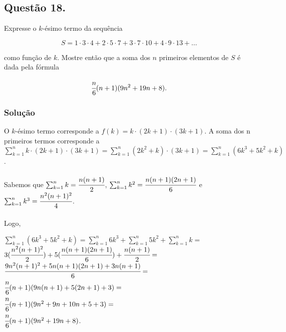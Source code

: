 \documentclass[12pt, letterpaper]{report}
\newcounter{ProblemNum}
\newcommand*{\anyproblem}[1]{\newpage\subsection*{#1}}
\newcommand*{\problem}[1]{\stepcounter{ProblemNum} %
   \anyproblem{Questão #1}}
\newcommand*{\soln}[1]{\subsubsection*{#1}}
\newcommand*{\solution}{\soln{Solução}}
\begin{document}
\problem{18.}
  Expresse o $ k $-ésimo termo da sequência 

  \begin{equation}
    S = 1 \cdot 3 \cdot 4 + 2 \cdot 5 \cdot 7 + 3 \cdot 7 \cdot 10 + 4 \cdot 9 \cdot 13 + \dots 
  \end{equation}

  como função de $ k $. Mostre então que a soma dos $ n $ primeiros elementos de $ S $ é dada pela fórmula

  \begin{equation}
    \cfrac{n}{6} (n + 1) (9n^2 + 19n + 8).
  \end{equation}

\solution
    O $k$-ésimo termo corresponde a $f(k) = k \cdot (2k + 1) \cdot (3k + 1)$. A soma dos n primeiros termos corresponde a $ \sum_{k = 1}^n k \cdot (2k + 1) \cdot (3k + 1) = \sum_{k = 1}^n (2k^2 + k) \cdot (3k + 1) = \sum_{k = 1}^n (6k^3 + 5k^2 + k)$. \\ \\

    Sabemos que $\sum_{k = 1}^n k = \cfrac{n(n+1)}{2}$, $\sum_{k = 1}^n k^2 = \cfrac{n(n+1)(2n+1)}{6}$ e $\sum_{k = 1}^n k^3 = \cfrac{n^2(n + 1)^2}{4}$. \\ \\

    Logo, 
    \begin{center}
    $\sum_{k = 1}^n (6k^3 + 5k^2 + k) = \sum_{k = 1}^n 6k^3 + \sum_{k = 1}^n 5k^2 + \sum_{k = 1}^n k =$ \\
    $ 3(\cfrac{n^2(n + 1)^2}{2}) + 5(\cfrac{n(n+1)(2n+1)}{6}) + \cfrac{n(n+1)}{2} =$ \\
    $ \cfrac{9n^2(n + 1)^2 + 5n(n+1)(2n+1)+3n(n+1)}{6} =$ \\
    $ \cfrac{n}{6}(n+1)(9n(n+1) + 5(2n+1)+ 3) =$ \\
    $ \cfrac{n}{6}(n+1)(9n^2 + 9n + 10n + 5 + 3) =$ \\
    $ \cfrac{n}{6}(n+1)(9n^2 + 19n + 8)$.
    \end{center}
\end{document}
